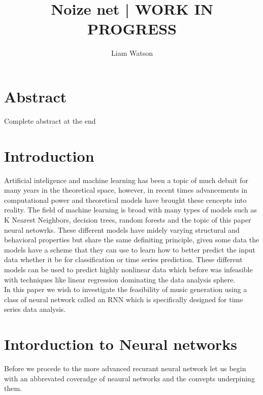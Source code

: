 \documentclass{article}
\title{Noize net | WORK IN PROGRESS}
\author{Liam Watson}
\begin{document}
\maketitle
\tableofcontents
\section{Abstract}
Complete abstract at the end
\section{Introduction}
Artificial inteligence and machine learning has been a topic of much debait for many years in the theoretical space, however, in recent times advancements in computational power and theoretical models have brought these cencepts into reality. The field of machine learning is broad with many types of models such as K Nearest Neighbors, decision trees, random forests and the topic of this paper neural netowrks. These different models have midely varying structural and behavioral properties but share the same definiting principle, given some data the models have a scheme that they can use to learn how to better predict the input data whether it be for classification or time series prediction. These different models can be used to predict highly nonlinear data which before was infeasible with techniques like linear regression dominating the data analysis sphere. \\
In this paper we wish to investigate the feasibility of music generation using a class of neural network called an RNN which is specifically designed for time series data analysis.  
\section{Intorduction to Neural networks}
\label{sec:intro}
Before we procede to the more advanced recurant neural network let us begin with an abbrevated coveradge of neaural networks and the convepts underpining them. 
\end{document}
